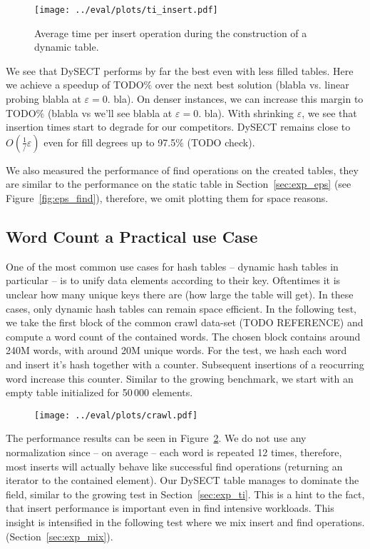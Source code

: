 \documentclass[a4paper,UKenglish]{lipics-v2016}
\begin{document}
\begin{figure}[ht]
  \centering
  \texttt{[image: ../eval/plots/ti\_insert.pdf]}
  \caption{\label{fig:ti_insert}Average time per insert operation
    during the construction of a dynamic table.}
\end{figure}

We see that DySECT performs by far the best even with less filled
tables.  Here we achieve a speedup of TODO$\%$ over the next best
solution (blabla vs. linear probing blabla at $\varepsilon = 0.$ bla).
On denser instances, we can increase this margin to TODO$\%$ (blabla
vs we'll see blabla at $\varepsilon = 0.$ bla).  With shrinking
$\varepsilon$, we see that insertion times start to degrade for our
competitors.  DySECT remains close to $O(\frac{1}/{\varepsilon})$ even
for fill degrees up to 97.5$\%$ (TODO check).

We also measured the performance of find operations on the created
tables, they are similar to the performance on the static table in
Section~\ref{sec:exp_eps} (see Figure~\ref{fig:eps_find}), therefore,
we omit plotting them for space reasons.

\subsection{Word Count a Practical use Case}
One of the most common use cases for hash tables -- dynamic hash
tables in particular -- is to unify data elements according to their
key.  Oftentimes it is unclear how many unique keys there are (how
large the table will get).  In these cases, only dynamic hash tables
can remain space efficient.  In the following test, we take the first
block of the common crawl data-set (TODO REFERENCE) and compute a word
count of the contained words.  The chosen block contains around 240M
words, with around 20M unique words. For the test, we hash each word
and insert it's hash together with a counter.  Subsequent insertions
of a reocurring word increase this counter.  Similar to the growing
benchmark, we start with an empty table initialized for 50\,000
elements.

\begin{figure}[ht]
  \centering
  \texttt{[image: ../eval/plots/crawl.pdf]}
  \caption{\label{fig:crawl} }
\end{figure}

The performance results can be seen in Figure~\ref{fig:crawl}.  We do
not use any normalization since -- on average -- each word is repeated
12 times, therefore, most inserts will actually behave like successful
find operations (returning an iterator to the contained element).  Our
DySECT table manages to dominate the field, similar to the growing
test in Section~\ref{sec:exp_ti}.  This is a hint to the fact, that
insert performance is important even in find intensive workloads.
This insight is intensified in the following test where we mix insert
and find operations.  (Section~\ref{sec:exp_mix}).
\end{document}
